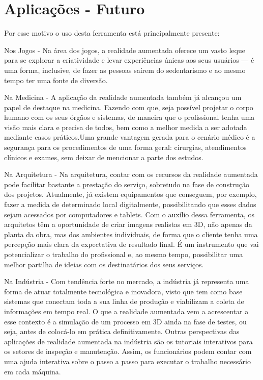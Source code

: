 \documentclass{report}
\begin{document}
\section{Aplicações - Futuro}


Por esse motivo o uso desta ferramenta está principalmente presente:

Nos Jogos - Na área dos jogos, a realidade aumentada oferece um vasto leque para se explorar a criatividade e levar experiências únicas aos seus usuários — é uma forma, inclusive, de fazer as pessoas saírem do sedentarismo e ao mesmo tempo ter uma fonte de diversão.

Na Medicina - A aplicação da realidade aumentada também já alcançou um papel de destaque na medicina. Fazendo com que, seja possível projetar o corpo humano com os seus órgãos e sistemas, de maneira que o profissional tenha uma visão mais clara e precisa de todos, bem como a melhor medida a ser adotada mediante casos práticos.Uma grande vantagem gerada para o cenário médico é a segurança para os procedimentos de uma forma geral: cirurgias, atendimentos clínicos e exames, sem deixar de mencionar a parte dos estudos.

Na Arquitetura - Na arquitetura, contar com os recursos da realidade aumentada pode facilitar bastante a prestação do serviço, sobretudo na fase de construção dos projetos. Atualmente, já existem equipamentos que conseguem, por exemplo, fazer a medida de determinado local digitalmente, possibilitando que esses dados sejam acessados por computadores e tablets. Com o auxílio dessa ferramenta, os arquitetos têm a oportunidade de criar imagens realistas em 3D,  não apenas da planta da obra, mas dos ambientes individuais, de forma que o cliente tenha uma percepção mais clara da expectativa de resultado final. É um instrumento que vai potencializar o trabalho do profissional e, ao mesmo tempo, possibilitar uma melhor partilha de ideias com os destinatários dos seus serviços.

Na Indústria - Com tendência forte no mercado, a indústria já representa uma forma de atuar totalmente tecnológica e inovadora, visto que tem como base sistemas que conectam toda a sua linha de produção e viabilizam a coleta de informações em tempo real. O que a realidade aumentada vem a acrescentar a esse contexto é a simulação de um processo em 3D ainda na fase de testes, ou seja, antes de colocá-lo em prática definitivamente. Outras perspectivas das aplicações de realidade aumentada na indústria são os tutoriais interativos para os setores de inspeção e manutenção. Assim, os funcionários podem contar com uma ajuda interativa sobre o passo a passo para executar o trabalho necessário em cada máquina.
\end{document}
